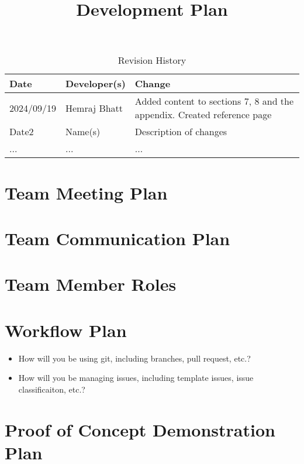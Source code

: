 \documentclass{article}
\title{Development Plan\\\progname}
\author{\authname}
\date{}
\begin{document}
\maketitle

\begin{table}[hp]
\caption{Revision History} \label{TblRevisionHistory}
\begin{tabularx}{\textwidth}{llX}
\toprule
\textbf{Date} & \textbf{Developer(s)} & \textbf{Change}\\
\midrule
2024/09/19 & Hemraj Bhatt & Added content to sections 7, 8 and the appendix. Created reference page\\
Date2 & Name(s) & Description of changes\\
... & ... & ...\\
\bottomrule
\end{tabularx}
\end{table}


\section{Team Meeting Plan}

\section{Team Communication Plan}

\section{Team Member Roles}

\section{Workflow Plan}

\begin{itemize}
	\item How will you be using git, including branches, pull request, etc.?
	\item How will you be managing issues, including template issues, issue
	classificaiton, etc.?
\end{itemize}

\section{Proof of Concept Demonstration Plan}
\end{document}
